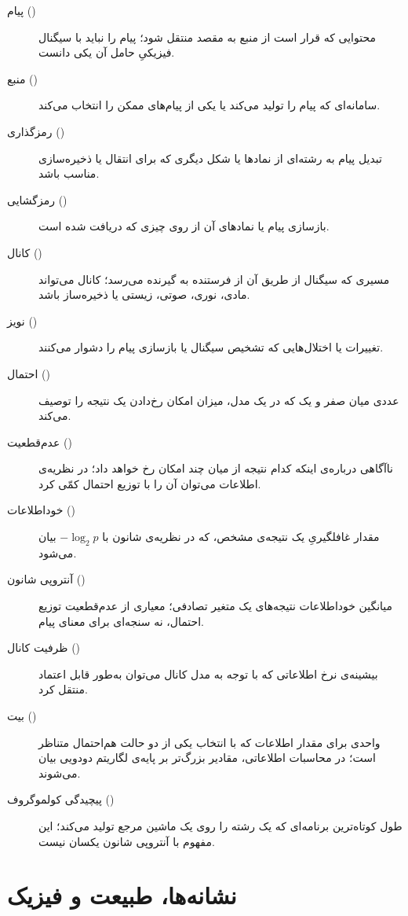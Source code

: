 \begin{description}
  \item[پیام ()] محتوایی که قرار است از منبع به مقصد منتقل شود؛ پیام را نباید با سیگنال فیزیکیِ حامل آن یکی دانست.
  \item[منبع ()] سامانه‌ای که پیام را تولید می‌کند یا یکی از پیام‌های ممکن را انتخاب می‌کند.
  \item[رمزگذاری ()] تبدیل پیام به رشته‌ای از نمادها یا شکل دیگری که برای انتقال یا ذخیره‌سازی مناسب باشد.
  \item[رمزگشایی ()] بازسازی پیام یا نمادهای آن از روی چیزی که دریافت شده است.
  \item[کانال ()] مسیری که سیگنال از طریق آن از فرستنده به گیرنده می‌رسد؛ کانال می‌تواند مادی، نوری، صوتی، زیستی یا ذخیره‌ساز باشد.
  \item[نویز ()] تغییرات یا اختلال‌هایی که تشخیص سیگنال یا بازسازی پیام را دشوار می‌کنند.
  \item[احتمال ()] عددی میان صفر و یک که در یک مدل، میزان امکان رخ‌دادن یک نتیجه را توصیف می‌کند.
  \item[عدم‌قطعیت ()] ناآگاهی درباره‌ی اینکه کدام نتیجه از میان چند امکان رخ خواهد داد؛ در نظریه‌ی اطلاعات می‌توان آن را با توزیع احتمال کمّی کرد.
  \item[خوداطلاعات ()] مقدار غافلگیریِ یک نتیجه‌ی مشخص، که در نظریه‌ی شانون با \(-\log_2 p\) بیان می‌شود.
  \item[آنتروپی شانون ()] میانگین خوداطلاعات نتیجه‌های یک متغیر تصادفی؛ معیاری از عدم‌قطعیت توزیع احتمال، نه سنجه‌ای برای معنای پیام.
  \item[ظرفیت کانال ()] بیشینه‌ی نرخ اطلاعاتی که با توجه به مدل کانال می‌توان به‌طور قابل اعتماد منتقل کرد.
  \item[بیت ()] واحدی برای مقدار اطلاعات که با انتخاب یکی از دو حالت هم‌احتمال متناظر است؛ در محاسبات اطلاعاتی، مقادیر بزرگ‌تر بر پایه‌ی لگاریتم دودویی بیان می‌شوند.
  \item[پیچیدگی کولموگروف ()] طول کوتاه‌ترین برنامه‌ای که یک رشته را روی یک ماشین مرجع تولید می‌کند؛ این مفهوم با آنتروپی شانون یکسان نیست.
\end{description}

\section*{نشانه‌ها، طبیعت و فیزیک}

